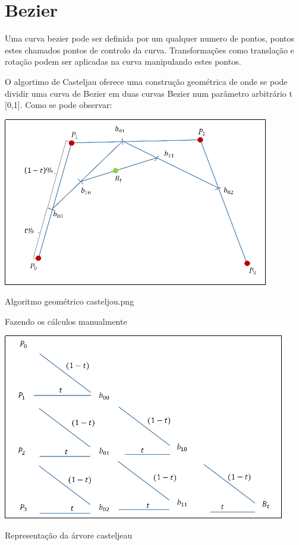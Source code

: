 \section{Bezier}

Uma curva bezier pode ser definida por um qualquer numero de pontos, pontos estes chamados pontos de controlo da curva. Transformações como translação e rotação podem ser aplicadas na curva manipulando estes pontos. 

O algortimo de Casteljau oferece uma construção geométrica de onde se pode dividir uma curva de Bezier em duas curvas Bezier num parâmetro arbitrário t [0,1]. Como se pode observar:

\begin{center}
 	
 	\includegraphics[scale=1.5,keepaspectratio]{resources/casteljou.png}
 	\captionsetup{type=figure, width=0.8\linewidth}
	\caption{Algoritmo geométrico casteljou.png}
\label{fig:ssec1:diagram:plane:to:sphere} 
\end{center}

Fazendo os cálculos manualmente 
\begin{center}
 	
 	\includegraphics[scale=1.5,keepaspectratio]{resources/casteljeau2.png}
 	\captionsetup{type=figure, width=0.8\linewidth}
	\caption{Representação da árvore casteljeau}
\label{fig:ssec1:diagram:plane:to:sphere} 
\end{center}

